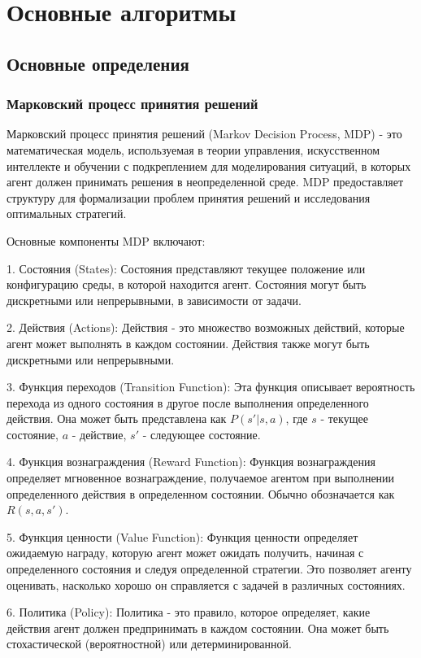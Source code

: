 \chapter{Основные алгоритмы}
\section{Основные определения}

\subsection{Марковский процесс принятия решений}
Марковский процесс принятия решений (Markov Decision Process, MDP) - это математическая модель, используемая в теории управления, искусственном интеллекте и обучении с подкреплением для моделирования ситуаций, в которых агент должен принимать решения в неопределенной среде. MDP предоставляет структуру для формализации проблем принятия решений и исследования оптимальных стратегий.

Основные компоненты MDP включают:

1. Состояния (States): Состояния представляют текущее положение или конфигурацию среды, в которой находится агент. Состояния могут быть дискретными или непрерывными, в зависимости от задачи.

2. Действия (Actions): Действия - это множество возможных действий, которые агент может выполнять в каждом состоянии. Действия также могут быть дискретными или непрерывными.

3. Функция переходов (Transition Function): Эта функция описывает вероятность перехода из одного состояния в другое после выполнения определенного действия. Она может быть представлена как $P(s'|s, a)$, где $s$ - текущее состояние, $a$ - действие, $s'$ - следующее состояние.

4. Функция вознаграждения (Reward Function): Функция вознаграждения определяет мгновенное вознаграждение, получаемое агентом при выполнении определенного действия в определенном состоянии. Обычно обозначается как $R(s, a, s')$.

5. Функция ценности (Value Function): Функция ценности определяет ожидаемую награду, которую агент может ожидать получить, начиная с определенного состояния и следуя определенной стратегии. Это позволяет агенту оценивать, насколько хорошо он справляется с задачей в различных состояниях.

6. Политика (Policy): Политика - это правило, которое определяет, какие действия агент должен предпринимать в каждом состоянии. Она может быть стохастической (вероятностной) или детерминированной.

